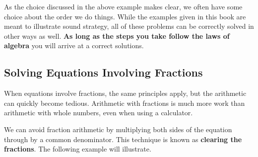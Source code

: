 As the choice discussed in the above example makes clear, we often have some choice about the order we do things. While the examples given in this book are meant to illustrate sound strategy, all of these problems can be correctly solved in other ways as well. \textbf{As long as the steps you take follow the laws of algebra} you will arrive at a correct solutions.

%
%

\subsection{Solving Equations Involving Fractions}

When equations involve fractions, the same principles apply, but the arithmetic can quickly become tedious. Arithmetic with fractions is much more work than arithmetic with whole numbers, even when using a calculator.

We can avoid fraction arithmetic by multiplying both sides of the equation through by a common denominator.  This technique is known as \textbf{clearing the fractions}. The following example will illustrate.



